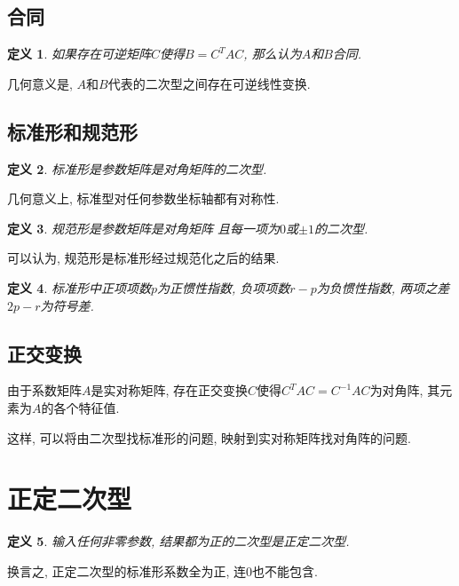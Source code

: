 \documentclass[UTF8,a4paper,11pt]{ctexart}
\newtheorem{definition}{定义}
\begin{document}
    \subsection{合同}
      \begin{definition}
        如果存在可逆矩阵$C$使得$B=C^{T}AC$,
        那么认为$A$和$B$合同.
      \end{definition}

      几何意义是, $A$和$B$代表的二次型之间存在可逆线性变换.

    \subsection{标准形和规范形}
      \begin{definition}
        标准形是参数矩阵是对角矩阵的二次型.
      \end{definition}

      几何意义上, 标准型对任何参数坐标轴都有对称性.

      \begin{definition}
        规范形是参数矩阵是对角矩阵
        且每一项为$0$或$\pm 1$的二次型.
      \end{definition}

      可以认为, 规范形是标准形经过规范化之后的结果.

      \begin{definition}
        标准形中正项项数$p$为正惯性指数,
        负项项数$r-p$为负惯性指数,
        两项之差$2p-r$为符号差.
      \end{definition}

    \subsection{正交变换}
      由于系数矩阵$A$是实对称矩阵,
      存在正交变换$C$使得$C^{T}AC=C^{-1}AC$为对角阵,
      其元素为$A$的各个特征值.

      这样, 可以将由二次型找标准形的问题,
      映射到实对称矩阵找对角阵的问题.

  \section{正定二次型}
    \begin{definition}
      输入任何非零参数, 结果都为正的二次型是正定二次型.
    \end{definition}

    换言之, 正定二次型的标准形系数全为正, 连$0$也不能包含.
\end{document}
